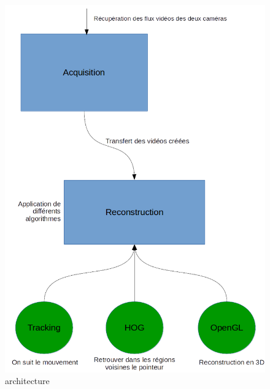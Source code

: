 \begin{figure}[!htb]
\centering
\includegraphics[width=\textwidth]{Modules/Picture/Architecture.png}
\caption{architecture}
\label{architecture}
\end{figure}

\clearpage